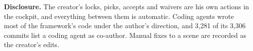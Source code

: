 \begin{center}\end{center}

\textbf{Disclosure.} The creator's locks, picks, accepts and waivers are his own actions in the cockpit, and everything between them is automatic. Coding agents wrote most of the framework's code under the author's direction, and 3,281 of its 3,306 commits list a coding agent as co-author. Manual fixes to a scene are recorded as the creator's edits.
